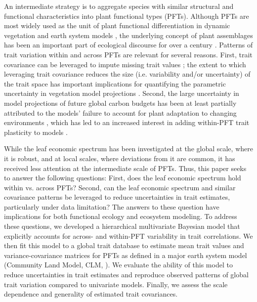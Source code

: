 \documentclass{article}
\begin{document}
An intermediate strategy is to aggregate species with similar structural and functional characteristics into plant functional types (PFTs).
Although PFTs are most widely used as the unit of plant functional differentiation in dynamic vegetation and earth system models
\citep{lavorel_1997_plant_functional_classifications,wullschleger_2014_plant,prentice_1992_special_paper},
the underlying concept of plant assemblages has been an important part of ecological discourse for over a century \citep{cowles_1899_ecological,clements_1936_nature,naeem_2003_disentangling}.
Patterns of trait variation within and across PFTs are relevant for several reasons.
First, trait covariance can be leveraged to impute missing trait values \citep{swenson_2013_phylogenetic};
the extent to which leveraging trait covariance reduces the size (i.e. variability and/or uncertainty) of the trait space has important implications for
quantifying the parametric uncertainty in vegetation model projections \citep{dietze_2013_improving,lebauer_2013_facilitating,dietze_2014_quantitative}.
Second, the large uncertainty in model projections of future global carbon budgets \citep{friedlingstein_2006_climate,friedlingstein_2014_uncertainties}
has been at least partially attributed to the models' failure to account for plant adaptation to changing environments \citep{sitch_2008_evaluation},
which has led to an increased interest in adding within-PFT trait plasticity to models \citep{van_2011_going,verheijen_2015_inclusion}.

While the leaf economic spectrum has been investigated at the global scale, where it is robust, and at local scales, where deviations from it are common, it has received less attention at the intermediate scale of PFTs.
Thus, this paper seeks to answer the following questions:
First, does the leaf economic spectrum hold within vs. across PFTs?
Second, can the leaf economic spectrum and similar covariance patterns be leveraged to reduce uncertainties in trait estimates, particularly under data limitation?
The answers to these question have implications for both functional ecology and ecosystem modeling.
To address these questions, we developed a hierarchical multivariate Bayesian model that explicitly accounts for across- and within-PFT variability in trait correlations.
We then fit this model to a global trait database to estimate mean trait values and variance-covariance matrices for PFTs as defined in a major earth system model (Community Land Model, CLM, \citealt{clm45_note}).
We evaluate the ability of this model to reduce uncertainties in trait estimates and reproduce observed patterns of global trait variation compared to univariate models.
Finally, we assess the scale dependence and generality of estimated trait covariances.
\end{document}
